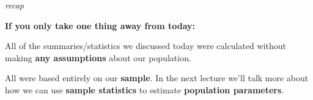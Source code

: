 \documentclass[ignorenonframetext,]{beamer}
\begin{document}
\begin{frame}[standout]{}
\protect\hypertarget{section-53}{}

\color{apricot}\textit{\gar\Huge recap}

\normalsize\color{white}\vspace{4ex}\textbf{If you only take one thing away from today:}

\vspace{2ex}

All of the summaries/statistics we discussed today were calculated
without making \textbf{any assumptions} about our population. \pause

\vspace{2ex}

All were based entirely on our \textbf{sample}. In the next lecture
we'll talk more about how we can use \textbf{sample statistics} to
estimate \textbf{population parameters}.

\end{frame}
\end{document}
